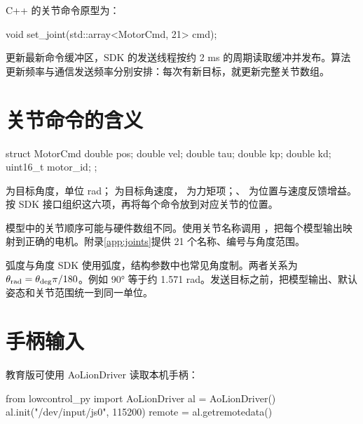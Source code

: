 C++ 的关节命令原型为：
\par\noindent\begin{minipage}{\linewidth}
\begin{command}
void set_joint(std::array<MotorCmd, 21> cmd);
\end{command}
\end{minipage}\par

 更新最新命令缓冲区，SDK 的发送线程按约 2 ms 的周期读取缓冲并发布。算法更新频率与通信发送频率分别安排：每次有新目标，就更新完整关节数组。
\section{关节命令的含义}
\par\noindent\begin{minipage}{\linewidth}
\begin{command}
struct MotorCmd {
    double pos;
    double vel;
    double tau;
    double kp;
    double kd;
    uint16_t motor_id;
};
\end{command}
\end{minipage}\par

 为目标角度，单位 rad； 为目标角速度， 为力矩项；、 为位置与速度反馈增益。按 SDK 接口组织这六项，再将每个命令放到对应关节的位置。

模型中的关节顺序可能与硬件数组不同。使用关节名称调用 ，把每个模型输出映射到正确的电机。附录\ref{app:joints}提供 21 个名称、编号与角度范围。
\begin{concept}{弧度与角度}
SDK 使用弧度，结构参数中也常见角度制。两者关系为 $\theta_{\rm rad}=\theta_{\rm deg}\pi/180$。例如 90° 等于约 1.571 rad。发送目标之前，把模型输出、默认姿态和关节范围统一到同一单位。
\end{concept}
\section{手柄输入}
教育版可使用 AoLionDriver 读取本机手柄：
\par\noindent\begin{minipage}{\linewidth}
\begin{command}
from lowcontrol_py import AoLionDriver
al = AoLionDriver()
al.init("/dev/input/js0", 115200)
remote = al.getremotedata()
\end{command}
\end{minipage}\par

